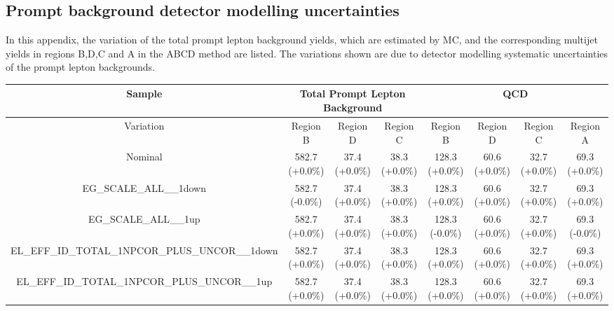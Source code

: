 \subsection{Prompt background detector modelling uncertainties}
\label{app:boosted_qcd_prompt_detector_modelling_unc}
In this appendix, the variation of the total prompt lepton background yields, which are estimated by MC,
and the corresponding multijet yields in regions B,D,C and A in the ABCD method are listed. The variations
shown are due to detector modelling systematic uncertainties of the prompt lepton backgrounds.
%
%
\begin{table}[htbp!]
\begin{tiny}
\begin{center}
\begin{tabular}{c|c|c|c||c|c|c|c}
Sample                                                       &\multicolumn{3}{c||}{Total Prompt Lepton Background}      &\multicolumn{4}{c}{QCD}                                                  \\
\hline  
Variation                                                    & Region B       & Region D         & Region C           & Region B        & Region D         & Region C          & Region A         \\ 
\hline  
Nominal                                                      & 582.7     (+0.0\%) & 37.4      (+0.0\%) & 38.3      (+0.0\%) & 128.3     (+0.0\%) & 60.6      (+0.0\%) & 32.7      (+0.0\%) & 69.3      (+0.0\%) \\ 
\hline
EG\_SCALE\_ALL\_\_1down                                      & 582.7     (-0.0\%) & 37.4      (+0.0\%) & 38.3      (+0.0\%) & 128.3     (+0.0\%) & 60.6      (+0.0\%) & 32.7      (+0.0\%) & 69.3      (+0.0\%) \\ 
EG\_SCALE\_ALL\_\_1up                                        & 582.7     (+0.0\%) & 37.4      (+0.0\%) & 38.3      (+0.0\%) & 128.3     (-0.0\%) & 60.6      (+0.0\%) & 32.7      (+0.0\%) & 69.3      (-0.0\%) \\ 
EL\_EFF\_ID\_TOTAL\_1NPCOR\_PLUS\_UNCOR\_\_1down             & 582.7     (+0.0\%) & 37.4      (+0.0\%) & 38.3      (+0.0\%) & 128.3     (+0.0\%) & 60.6      (+0.0\%) & 32.7      (+0.0\%) & 69.3      (+0.0\%) \\ 
EL\_EFF\_ID\_TOTAL\_1NPCOR\_PLUS\_UNCOR\_\_1up               & 582.7     (+0.0\%) & 37.4      (+0.0\%) & 38.3      (+0.0\%) & 128.3     (+0.0\%) & 60.6      (+0.0\%) & 32.7      (+0.0\%) & 69.3      (+0.0\%) \\ 

\end{tabular}
\end{center}
\end{tiny}
\end{table}
